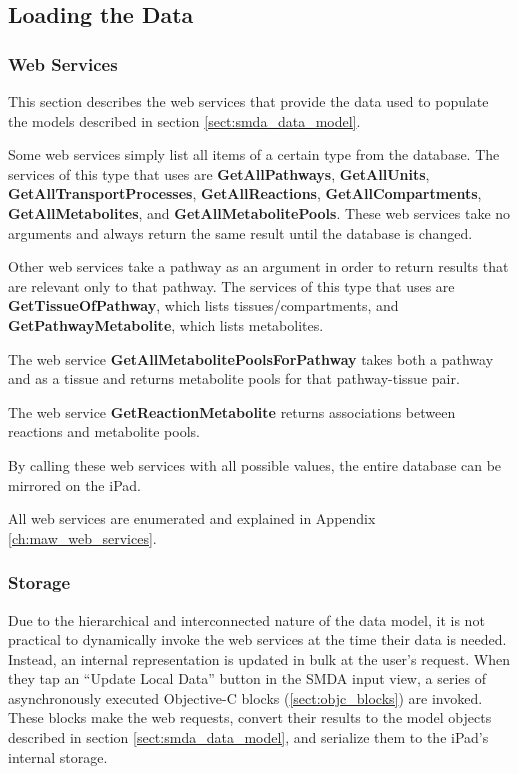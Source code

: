 \subsection{Loading the Data}
\label{sect:smda_all_data}

\subsubsection{Web Services}
\label{sect:smda_web_services}

This section describes the web services that provide the data used to populate
the models described in section \ref{sect:smda_data_model}.

Some web services simply list all items of a certain type from the database. The
services of this type that \mawapp uses are \textbf{GetAllPathways},
\textbf{GetAllUnits}, \textbf{GetAllTransportProcesses},
\textbf{GetAllReactions}, \textbf{GetAllCompartments},
\textbf{GetAllMetabolites}, and \textbf{GetAllMetabolitePools}. These web
services take no arguments and always return the same result until the database
is changed.

Other web services take a pathway as an argument in order to return results that
are relevant only to that pathway. The services of this type that \mawapp uses
are \textbf{GetTissueOfPathway}, which lists tissues/compartments, and
\textbf{GetPathwayMetabolite}, which lists metabolites.

The web service \textbf{GetAllMetabolitePoolsForPathway} takes both a pathway
and as a tissue and returns metabolite pools for that pathway-tissue pair.

The web service \textbf{GetReactionMetabolite} returns associations between
reactions and metabolite pools.

By calling these web services with all possible values, the entire database can
be mirrored on the iPad.

All \pathcasemaw web services are enumerated and explained in Appendix
\ref{ch:maw_web_services}.

\subsubsection{Storage}

Due to the hierarchical and interconnected nature of the data model, it is not
practical to dynamically invoke the web services at the time their data is
needed. Instead, an internal representation is updated in bulk at the user's
request. When they tap an ``Update Local Data'' button in the SMDA input view, a
series of asynchronously executed Objective-C blocks (\ref{sect:objc_blocks})
are invoked. These blocks make the web requests, convert their results to the
model objects described in section \ref{sect:smda_data_model}, and serialize
them to the iPad's internal storage.

